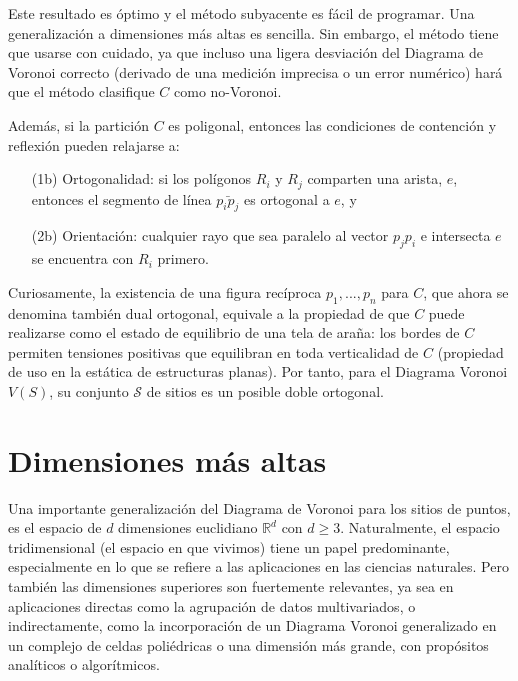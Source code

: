 Este resultado es óptimo y el método subyacente es fácil de programar. Una generalización a dimensiones más altas es sencilla. Sin embargo, el método tiene que usarse con cuidado, ya que incluso una ligera desviación del Diagrama de Voronoi correcto (derivado de una medición imprecisa o un error numérico) hará que el método clasifique $C$ como no-Voronoi.
\vspace{0.3cm}

Además, si la partición $C$ es poligonal, entonces las condiciones de contención y reflexión pueden relajarse a:
    \begin{itemize}
        \item [(1b)] Ortogonalidad: si los polígonos $R_{i}$ y $R_{j}$ comparten una arista, $e$, entonces el segmento de línea $\bar{p_{i}p_{j}}$ es ortogonal a $e$, y
        \item [(2b)] Orientación: cualquier rayo que sea paralelo al vector $p_{j}p_{i}$ e intersecta $e$ se encuentra con $R_{i}$ primero.
    \end{itemize}
\vspace{0.3cm}    

Curiosamente, la existencia de una figura recíproca $p_{1},...,p_{n}$ para $C$, que ahora se denomina también dual ortogonal, equivale a la propiedad de que $C$ puede realizarse como el estado de equilibrio de una tela de araña: los bordes de $C$ permiten tensiones positivas que equilibran en toda verticalidad de $C$ (propiedad de uso en la estática de estructuras planas). Por tanto, para el Diagrama Voronoi $V(S)$, su conjunto $\mathcal{S}$ de sitios es un posible doble ortogonal.
\vspace{0.3cm}

 

\section{Dimensiones más altas} \label{altasdim}


Una importante generalización del Diagrama de Voronoi para los sitios de puntos, es el espacio de $d$ dimensiones euclidiano $\mathbb{R}^d$ con $d \geq3$. Naturalmente, el espacio tridimensional (el espacio en que vivimos) tiene un papel predominante, especialmente en lo que se refiere a las aplicaciones en las ciencias naturales. Pero también las dimensiones superiores son fuertemente relevantes, ya sea en aplicaciones directas como la agrupación de datos multivariados, o indirectamente, como la incorporación de un Diagrama Voronoi generalizado en un complejo de celdas poliédricas o una dimensión más grande, con propósitos analíticos o algorítmicos.

